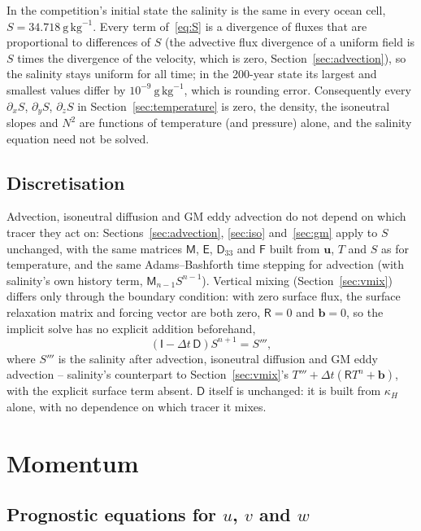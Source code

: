 \documentclass{article}
\begin{document}
In the competition's initial state the salinity is the same in every ocean cell, $S = 34.718~\text{g}\,\text{kg}^{-1}$.
Every term of~\eqref{eq:S} is a divergence of fluxes that are proportional to differences of $S$ (the advective flux divergence of a uniform field is $S$ times the divergence of the velocity, which is zero, Section~\ref{sec:advection}), so the salinity stays uniform for all time; in the 200-year state its largest and smallest values differ by $10^{-9}~\text{g}\,\text{kg}^{-1}$, which is rounding error.
Consequently every $\partial_x S$, $\partial_y S$, $\partial_z S$ in Section~\ref{sec:temperature} is zero, the density, the isoneutral slopes and $N^2$ are functions of temperature (and pressure) alone, and the salinity equation need not be solved.

\subsection{Discretisation}

Advection, isoneutral diffusion and GM eddy advection do not depend on which tracer they act on: Sections~\ref{sec:advection}, \ref{sec:iso} and~\ref{sec:gm} apply to $S$ unchanged, with the same matrices $\mathsf{M}$, $\mathsf{E}$, $\mathsf{D}_{33}$ and $\mathsf{F}$ built from $\mathbf{u}$, $T$ and $S$ as for temperature, and the same Adams--Bashforth time stepping for advection (with salinity's own history term, $\mathsf{M}_{n-1}S^{n-1}$).
Vertical mixing (Section~\ref{sec:vmix}) differs only through the boundary condition: with zero surface flux, the surface relaxation matrix and forcing vector are both zero, $\mathsf{R}=0$ and $\mathbf{b}=0$, so the implicit solve has no explicit addition beforehand,
\[
\left( \mathsf{I} - \Delta t\, \mathsf{D} \right) S^{n+1} = S''',
\]
where $S'''$ is the salinity after advection, isoneutral diffusion and GM eddy advection -- salinity's counterpart to Section~\ref{sec:vmix}'s $T''' + \Delta t(\mathsf{R}T^n+\mathbf{b})$, with the explicit surface term absent.
$\mathsf{D}$ itself is unchanged: it is built from $\kappa_H$ alone, with no dependence on which tracer it mixes.

\section{Momentum}\label{sec:momentum}

\subsection{\texorpdfstring{Prognostic equations for $u$, $v$ and $w$}{Prognostic equations for u, v and w}}\label{sec:uvw}
\end{document}
